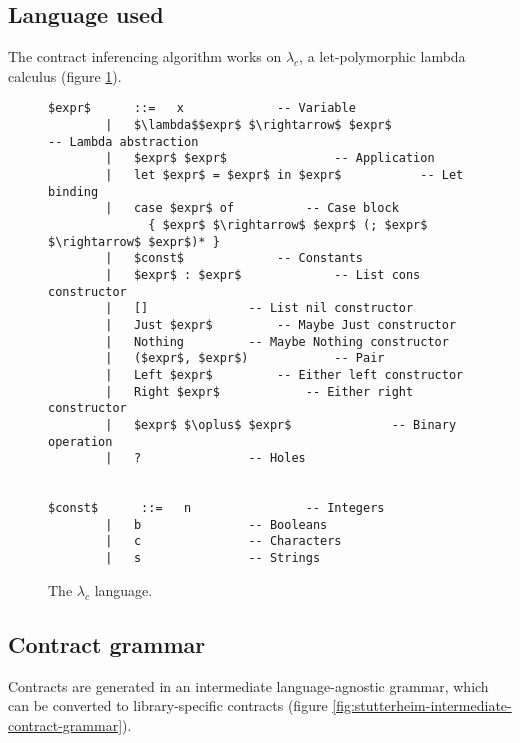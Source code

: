 \documentclass[10pt]{report}
\begin{document}
\subsection{Language used}

The contract inferencing algorithm works on $\lambda_c$, a let-polymorphic lambda calculus (figure \ref{stutterheim-lambda-language}).

\begin{figure}[htps]
\begin{lstlisting}[mathescape]
$expr$      ::=   x				-- Variable
        |   $\lambda$$expr$ $\rightarrow$ $expr$				-- Lambda abstraction
        |   $expr$ $expr$				-- Application
        |   let $expr$ = $expr$ in $expr$			-- Let binding
        |   case $expr$ of			-- Case block
              { $expr$ $\rightarrow$ $expr$ (; $expr$ $\rightarrow$ $expr$)* }
        |   $const$				-- Constants
        |   $expr$ : $expr$				-- List cons constructor
        |   []				-- List nil constructor
        |   Just $expr$			-- Maybe Just constructor
        |   Nothing			-- Maybe Nothing constructor
        |   ($expr$, $expr$)			-- Pair
        |   Left $expr$			-- Either left constructor
        |   Right $expr$			-- Either right constructor
        |   $expr$ $\oplus$ $expr$				-- Binary operation
        |   ?				-- Holes


$const$      ::=   n				-- Integers
        |   b				-- Booleans
        |   c				-- Characters
        |   s				-- Strings
\end{lstlisting}
\caption{\label{stutterheim-lambda-language}The $\lambda_c$ language.}
\end{figure}

\subsection{Contract grammar}

Contracts are generated in an intermediate language-agnostic grammar, which can be converted to library-specific contracts (figure \ref{fig:stutterheim-intermediate-contract-grammar}).
\end{document}
